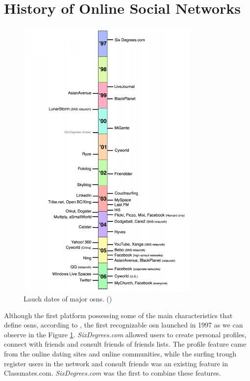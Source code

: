 \section{History of Online Social Networks}
\begin{figure}
\begin{center}
  \includegraphics[width=0.8\textwidth]{img/timeline.png}
\end{center}
\caption{\label{img:timeline} Lauch dates of major \glspl{osn}. (\cite{ellison2007social})}
\end{figure}

\indent \indent Although the first platform possessing some of the main characteristics that define \glspl{osn},
according to \cite{ellison2007social}, the first recognizable \gls{osn} launched in 1997 as we can observe in the Figure \ref{img:timeline}. \textit{SixDegrees.com} allowed users to create personal
profiles, connect with friends and consult friends of friends lists. The profile feature came from the
online dating sites and online communities, while the surfing trough register users in the network
and consult friends was an existing feature in Classmates.com. \textit{SixDegrees.com} was the first to combine
these features.

